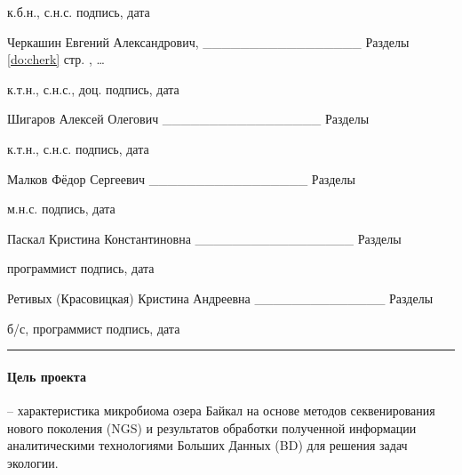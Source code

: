 \documentclass[a4paper,12pt,openany,final]{extreport}
\makeatletter
\def\vhrulefill#1{\leavevmode\leaders\hrule\@height#1\hfill \kern\z@}
\newcommand\toprule{\noindent\vhrulefill{2pt}}
\makeatother
\begin{document}
\begin{titlepage}
к.б.н., с.н.с. подпись, дата

Черкашин Евгений Александрович, \_\_\_\_\_\_\_\_\_\_\_\_\_\_\_\_\_
Разделы \ref{do:cherk} стр. \pageref{do:cherk}, \ldots

к.т.н., с.н.с., доц. подпись, дата

Шигаров Алексей Олегович \_\_\_\_\_\_\_\_\_\_\_\_\_\_\_\_\_ Разделы

к.т.н., с.н.с. подпись, дата

Малков Фёдор Сергеевич \_\_\_\_\_\_\_\_\_\_\_\_\_\_\_\_\_ Разделы

м.н.с. подпись, дата

Паскал Кристина Константиновна \_\_\_\_\_\_\_\_\_\_\_\_\_\_\_\_\_
Разделы

программист подпись, дата

Ретивых (Красовицкая) Кристина Андреевна \_\_\_\_\_\_\_\_\_\_\_\_\_\_
Разделы

б/с, программист подпись, дата
\end{titlepage}
\begin{titlepage}
\tableofcontents{}
\end{titlepage}
\thispagestyle{empty}

\label{chap:aim}

\toprule
\paragraph{Цель проекта} \hspace{-2ex}-- характеристика микробиома озера Байкал на основе
методов секвенирования нового поколения (NGS) и результатов обработки
полученной информации аналитическими технологиями Больших Данных (BD)
для решения задач экологии.
\end{document}
